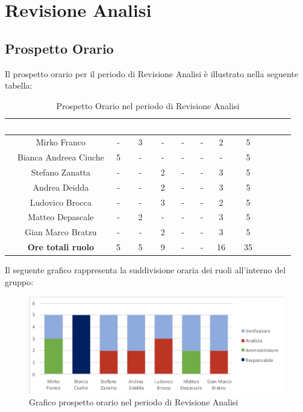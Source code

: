 \newpage

\section{Revisione Analisi}
\subsection{Prospetto Orario}
Il prospetto orario per il periodo di Revisione Analisi è illustrato nella seguente tabella:

\begin{table}[ht]
	\begin{center}
		\begin{tabular}{cccccccccccc}
			\rowcolor{coolblack}
			\hline 
			& \textcolor{white}{Nome} & \textcolor{white}{Re} & \textcolor{white}{Am} & \textcolor{white}{An} & \textcolor{white}{Pt} &\textcolor{white}{Pr} & \textcolor{white}{Ve} & \textcolor{white}{Totale} \\
			\hline
			
			&Mirko Franco          & - & 3 & - & - & - & 2 &5  \\
			&Bianca Andreea Ciuche        & 5  & - & - & - & - & - & 5 \\
			&Stefano Zanatta     & -& - & 2 & - & - & 3&5 \\
			&Andrea Deidda       &  -& - & 2 & - & - & 3 &5 \\
			&Ludovico Brocca    & -& -& 3 & - & - & 2 & 5 \\
			&Matteo Depascale  & -& 2& -& - & - & 3 & 5 \\
			&Gian Marco Bratzu & -& - & 2 & - & - & 3& 5 \\
			\hline
			&\textbf{Ore totali ruolo} & 5 & 5 & 9 & - & - & 16 & 35 \\
		\end{tabular}
		\caption{Prospetto Orario nel periodo di Revisione Analisi}
	\end{center}
\end{table}

Il seguente grafico rappresenta la suddivisione oraria dei ruoli all'interno del gruppo:
\begin{figure}[!ht]
	\begin{center}
		\includegraphics{images/grafoProspettoOrarioDett.png}
		\caption{Grafico prospetto orario nel periodo di Revisione Analisi }
	\end{center}
\end{figure}
\newpage
